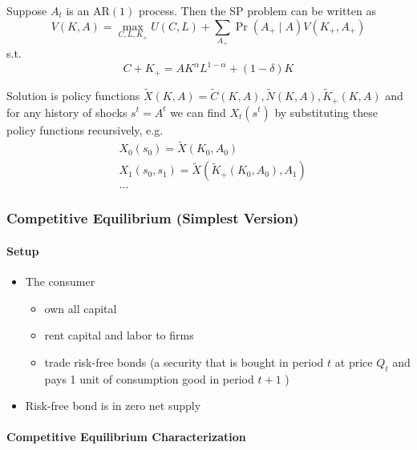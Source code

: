 \documentclass[10pt]{article}
\begin{document}
Suppose $A_t$ is an $\mathrm{AR}(1)$ process. Then the SP problem can be written as
$$
V(K, A)=\max _{C, L, K_{+}} U(C, L)+\sum_{A_{+}} \operatorname{Pr}\left(A_{+} \mid A\right) V\left(K_{+}, A_{+}\right)
$$
s.t.
$$
C+K_{+}=A K^\alpha L^{1-\alpha}+(1-\delta) K
$$

Solution is policy functions $\widetilde{X}(K, A)=\widetilde{C}(K, A), \widetilde{N}(K, A), \widetilde{K}_{+}(K, A)$ and for any history of shocks $s^t=A^t$ we can find $X_t\left(s^t\right)$ by substituting these policy functions recursively, e.g.
$$
\begin{aligned}
& X_0\left(s_0\right)=\widetilde{X}\left(K_0, A_0\right) \\
& X_1\left(s_0, s_1\right)=\widetilde{X}\left(\widetilde{K}_{+}\left(K_0, A_0\right), A_1\right) \\
& \ldots
\end{aligned}
$$


\subsubsection{Competitive Equilibrium (Simplest Version)}

\paragraph{Setup}

\begin{itemize}
    \item The consumer
        \begin{itemize}
            \item own all capital
            \item rent capital and labor to firms
            \item trade risk-free bonds (a security that is bought in period $t$ at price $Q_t$ and pays 1 unit of consumption good in period $t+1$ )
        \end{itemize}
    \item Risk-free bond is in zero net supply
\end{itemize}

\paragraph{Competitive Equilibrium Characterization}
\end{document}
